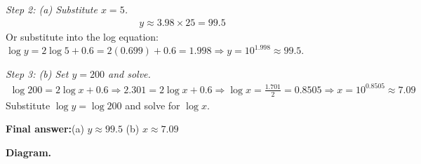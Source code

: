 \documentclass[11pt]{article}
\begin{document}
\textit{Step 2: (a) Substitute \( x = 5 \).}
\[\begin{gathered}
y \approx 3.98 \times 25 = 99.5
\end{gathered}\]
Or substitute into the log equation: \( \log y = 2\log 5 + 0.6 = 2(0.699) + 0.6 = 1.998 \Rightarrow y = 10^{1.998} \approx 99.5 \).

\textit{Step 3: (b) Set \( y = 200 \) and solve.}
\[\begin{gathered}
\log 200 = 2\log x + 0.6 \Rightarrow 2.301 = 2\log x + 0.6 \Rightarrow \log x = \frac{1.701}{2} = 0.8505 \Rightarrow x = 10^{0.8505} \approx 7.09
\end{gathered}\]
Substitute \( \log y = \log 200 \) and solve for \( \log x \).

\begin{answerbox}
\textbf{Final answer:}\quad (a) \(\displaystyle  y \approx 99.5 \) \quad  (b) \(\displaystyle  x \approx 7.09 \)
\end{answerbox}
\textbf{Diagram.}
\end{document}
